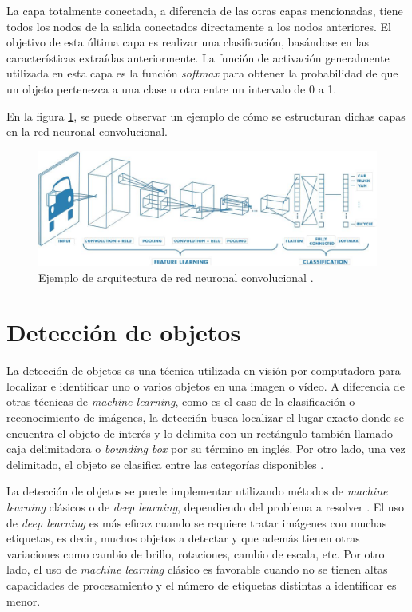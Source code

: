 La capa totalmente conectada, a diferencia de las otras capas mencionadas, tiene todos los nodos de la salida conectados directamente a los nodos anteriores. El objetivo de esta última capa es realizar una clasificación, basándose en las características extraídas anteriormente. La función de activación generalmente utilizada en esta capa es la función \textit{softmax} para obtener la probabilidad de que un objeto pertenezca a una clase u otra entre un intervalo de 0 a 1.

En la figura \ref{fig:cnn}, se puede observar un ejemplo de cómo se estructuran dichas capas en la red neuronal convolucional.


\begin{figure}[ht]
	\centering
	\includegraphics[scale=.35]{./Figures/cnn-image.jpeg}
	\caption{Ejemplo de arquitectura de red neuronal convolucional \cite{WEBSITE:2}.}
	\label{fig:cnn}
\end{figure}


\section{Detección de objetos}

La detección de objetos es una técnica utilizada en visión por computadora para localizar e identificar uno o varios objetos en una imagen o vídeo. A diferencia de otras técnicas de \textit{machine learning}, como es el caso de la clasificación o reconocimiento de imágenes, la detección busca localizar el lugar exacto donde se encuentra el objeto de interés y lo delimita con un rectángulo también llamado caja delimitadora o \textit{bounding box} por su término en inglés. Por otro lado, una vez delimitado, el objeto se clasifica entre las categorías disponibles \cite{WEBSITE:5}.

La detección de objetos se puede implementar utilizando métodos de \textit{machine learning} clásicos o de \textit{deep learning}, dependiendo del problema a resolver \cite{WEBSITE:6}. El uso de \textit{deep learning} es más eficaz cuando se requiere tratar imágenes con muchas etiquetas, es decir, muchos objetos a detectar y que además tienen otras variaciones como cambio de brillo, rotaciones, cambio de escala, etc. Por otro lado, el uso de \textit{machine learning} clásico es favorable cuando no se tienen altas capacidades de procesamiento y el número de etiquetas distintas a identificar es menor.

